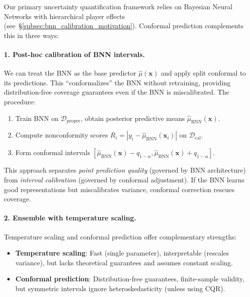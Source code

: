Our primary uncertainty quantification framework relies on Bayesian Neural Networks with hierarchical player effects (see~\S\ref{subsec:bnn_calibration_motivation}). Conformal prediction complements this in three ways:

\paragraph{1. Post-hoc calibration of BNN intervals.}
We can treat the BNN as the base predictor $\hat{\mu}(\mathbf{x})$ and apply split conformal to its predictions. This ``conformalizes'' the BNN without retraining, providing distribution-free coverage guarantees even if the BNN is miscalibrated. The procedure:

\begin{enumerate}
    \item Train BNN on $\mathcal{D}_{\text{proper}}$, obtain posterior predictive means $\hat{\mu}_{\text{BNN}}(\mathbf{x})$.
    \item Compute nonconformity scores $R_i = |y_i - \hat{\mu}_{\text{BNN}}(\mathbf{x}_i)|$ on $\mathcal{D}_{\text{cal}}$.
    \item Form conformal intervals $[\hat{\mu}_{\text{BNN}}(\mathbf{x}) - q_{1-\alpha}, \hat{\mu}_{\text{BNN}}(\mathbf{x}) + q_{1-\alpha}]$.
\end{enumerate}

This approach separates \textit{point prediction quality} (governed by BNN architecture) from \textit{interval calibration} (governed by conformal adjustment). If the BNN learns good representations but miscalibrates variance, conformal correction rescues coverage.

\paragraph{2. Ensemble with temperature scaling.}
Temperature scaling and conformal prediction offer complementary strengths:

\begin{itemize}
    \item \textbf{Temperature scaling}: Fast (single parameter), interpretable (rescales variance), but lacks theoretical guarantees and assumes constant scaling.
    \item \textbf{Conformal prediction}: Distribution-free guarantees, finite-sample validity, but symmetric intervals ignore heteroskedasticity (unless using CQR).
\end{itemize}

